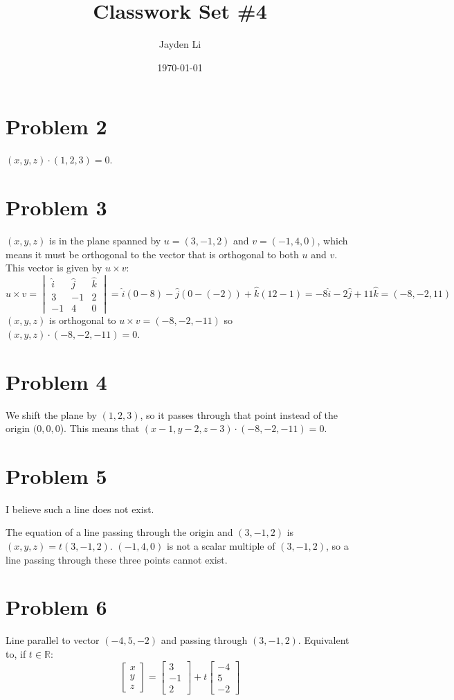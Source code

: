 \documentclass[preview, margin=0.6in]{standalone}
\title{\vspace*{-40pt}Classwork Set \#4}
\author{Jayden Li}
\date{\today}
\newcommand*{\problem}[1]{\section*{Problem #1}}
\begin{document}
\fontsize{12pt}{12pt}\selectfont
\setlength{\abovedisplayskip}{\abovedisplayskip/2}
\setlength{\belowdisplayskip}{\belowdisplayskip/2}
\setlength{\parindent}{0pt}
\setlength{\parskip}{2ex plus 0.5ex minus 0.2ex}
\maketitle

\problem{2}
$(x,y,z)\cdot(1,2,3)=0$.

\problem{3}
$(x,y,z)$ is in the plane spanned by $u=(3,-1,2)$ and $v=(-1,4,0)$, which means it must be orthogonal to the vector that is orthogonal to both $u$ and $v$. This vector is given by $u\times v$:
\begin{equation*}
    u\times v
	=\begin{vmatrix}
		\hat i & \hat j & \hat k \\
		3 & -1 & 2 \\
		-1 & 4 & 0
	\end{vmatrix}
	=\hat i \left( 0-8 \right)-\hat j \left( 0-(-2) \right)+\hat k \left( 12-1 \right)
	=-8\hat i-2\hat j+11\hat k
	=(-8,-2,11)
\end{equation*}
$(x,y,z)$ is orthogonal to $u\times v=(-8,-2,-11)$ so $(x,y,z)\cdot (-8,-2,-11)=0$.

\problem{4}
We shift the plane by $(1,2,3)$, so it passes through that point instead of the origin $(0,0,0$). This means that $(x-1,y-2,z-3)\cdot (-8,-2,-11)=0$.

\problem{5}

I believe such a line does not exist.

The equation of a line passing through the origin and $(3,-1,2)$ is $(x,y,z)=t(3,-1,2)$. $(-1,4,0)$ is not a scalar multiple of $(3,-1,2)$, so a line passing through these three points cannot exist.

\problem{6}
Line parallel to vector $(-4,5,-2)$ and passing through $(3,-1,2)$. Equivalent to, if $t\in\mathbb R$:
\begin{equation*}
    \begin{bmatrix}
		x \\ y \\ z
    \end{bmatrix}
	=\begin{bmatrix}
		3 \\ -1 \\ 2
	\end{bmatrix}
	+t \begin{bmatrix}
		-4 \\ 5 \\ -2
	\end{bmatrix}
\end{equation*}
\end{document}

